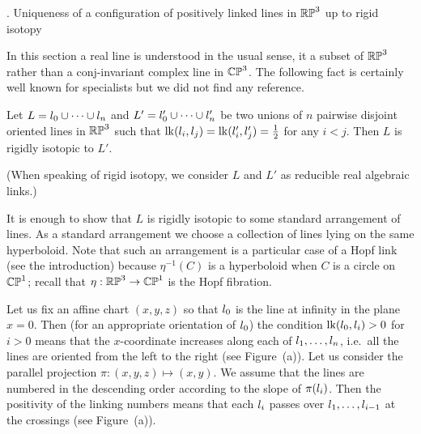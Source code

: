 



\head\sectHopf. Uniqueness of a configuration of positively linked lines in $\Bbb{RP}^3$ up to rigid isotopy
\endhead

In this section a real line is understood in the usual sense, it a subset of $\Bbb{RP}^3$ rather than a
conj-invariant complex line in $\Bbb{CP}^3$.
The following fact is certainly well known for specialists but we did not find any reference.

 Let $L=l_0\cup\dots\cup l_n$ and $L'=l'_0\cup\dots\cup l'_n$
be two unions of $n$ pairwise disjoint oriented lines in $\Bbb{RP}^3$ such that
$\operatorname{lk}(l_i,l_j)=\operatorname{lk}(l'_i,l'_j)=\frac12$ for any $i<j$.
Then $L$ is rigidly isotopic to $L'$.
\endproclaim

\noindent
(When speaking of rigid isotopy, we consider $L$ and $L'$ as reducible real algebraic links.)

 It is enough to show that $L$ is rigidly isotopic to some standard arrangement of lines.
As a standard arrangement we choose a collection of lines lying on the same hyperboloid.
Note that such an arrangement is a particular case of a Hopf link (see the introduction)
because $\eta^{-1}(C)$ is a hyperboloid when $C$ is a circle on $\Bbb{CP}^1$; recall that
$\eta:\Bbb{RP}^3\to\Bbb{CP}^1$ is the Hopf fibration.

Let us fix an affine chart $(x,y,z)$ so that $l_0$ is the line at infinity in the plane \hbox{$x=0$}.
Then (for an appropriate orientation of $l_0$) the condition $\operatorname{lk}(l_0,l_i)>0$ for $i>0$ means that the $x$-coordinate
increases along each of $l_1,\dots,l_n$, i.e.~all the lines are oriented from the left to the right
(see Figure~\figHopf(a)).
Let us consider the parallel projection
$\pi:(x,y,z)\mapsto(x,y)$.
We assume that the lines are numbered in the descending order according to the
slope of $\pi(l_i)$.
Then the positivity of the linking numbers means that each $l_i$ passes over $l_{1},\dots,l_{i-1}$
at the crossings (see Figure~\figHopf(a)).

